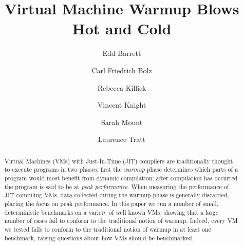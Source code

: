 \documentclass[a4paper,UKenglish]{lipics}
\begin{document}
\title{Virtual Machine Warmup Blows Hot and Cold}
\author[1]{Edd Barrett}
\author[2]{Carl Friedrich Bolz}
\author[3]{Rebecca Killick}
\author[4]{Vincent Knight}
\author[5]{Sarah Mount}
\author[6]{Laurence Tratt}



\maketitle

\begin{abstract}
Virtual Machines (VMs) with Just-In-Time (JIT) compilers are traditionally thought
to execute programs in two phases: first the \emph{warmup} phase determines which
parts of a program would most benefit from dynamic compilation; after
compilation has occurred the program is said to be at \emph{peak performance}.
When measuring the performance of JIT compiling VMs, data collected
during the warmup phase is generally discarded, placing the focus on peak
performance. In this paper we run a number of small,
deterministic benchmarks on a variety of well known VMs, showing that a large number
of cases fail to conform to the traditional notion of warmup. Indeed,
every VM we tested fails to conform to the traditional notion of warmup in at
least one benchmark, raising questions about how VMs should be benchmarked.
\end{abstract}
\end{document}
